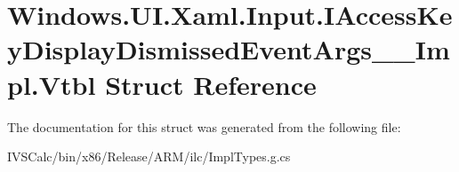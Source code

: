 \hypertarget{struct_windows_1_1_u_i_1_1_xaml_1_1_input_1_1_i_access_key_display_dismissed_event_args_____impl_1_1_vtbl}{}\section{Windows.\+U\+I.\+Xaml.\+Input.\+I\+Access\+Key\+Display\+Dismissed\+Event\+Args\+\_\+\+\_\+\+Impl.\+Vtbl Struct Reference}
\label{struct_windows_1_1_u_i_1_1_xaml_1_1_input_1_1_i_access_key_display_dismissed_event_args_____impl_1_1_vtbl}


The documentation for this struct was generated from the following file\+:\begin{DoxyCompactItemize}
\item 
I\+V\+S\+Calc/bin/x86/\+Release/\+A\+R\+M/ilc/Impl\+Types.\+g.\+cs\end{DoxyCompactItemize}
